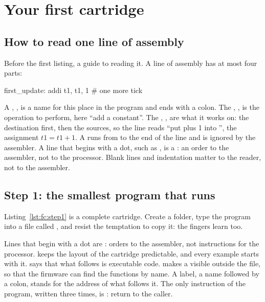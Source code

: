 \section{Your first cartridge}

\subsection{How to read one line of assembly}

Before the first listing, a guide to reading it. A line of assembly has at most
four parts:

\begin{asm}
first_update:   addi t1, t1, 1      # one more tick
\end{asm}

\noindent A , , is a name for this place in
the program and ends with a colon. The , , is the
operation to perform, here ``add a constant''. The ,
, are what it works on: the destination first, then the
sources, so the line reads ``put  plus 1 into '', the
assignment $t1 = t1 + 1$. A  runs from \code{\#} to the end of the
line and is ignored by the assembler. A line that begins with a dot, such as
, is a : an order to the assembler, not to
the processor. Blank lines and indentation matter to the reader, not to the
assembler.

\subsection{Step 1: the smallest program that runs}

Listing~\ref{lst:fc:step1} is a complete cartridge. Create a folder, type the
program into a file called , and resist the
temptation to copy it: the fingers learn too.


Lines that begin with a dot are : orders to the assembler,
not instructions for the processor.  keeps the layout
of the cartridge predictable, and every \prg example starts with it.
 says that what follows is executable code.
 makes a  visible outside the file, so that the
firmware can find the functions by name. A label, a name followed by a colon,
stands for the address of what follows it. The only instruction of the
program, written three times, is : return to the caller.

